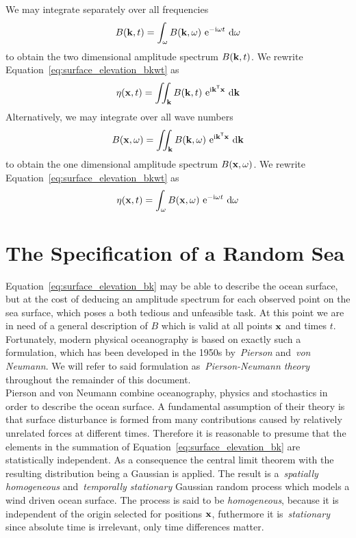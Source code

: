 We may integrate separately over all frequencies
%
\begin{equation}
 B(\mathbf{k}, t) = \int_{\omega} B(\mathbf{k},
\omega)~\mathrm{e}^{-\mathrm{i}\omega t}~\mathrm{d}\omega
\end{equation}
to obtain the two dimensional amplitude spectrum $B(\mathbf{k}, t)$. We rewrite
Equation~\ref{eq:surface_elevation_bkwt} as
\begin{equation}
\label{eq:surface_elevation_bk}
 \eta(\mathbf{x}, t) = \iint_{\mathbf{k}} B(\mathbf{k},t)
~\mathrm{e}^{\mathrm{i}\mathbf{k}^{\mathsf{T}}\mathbf{x}}~
\mathrm{d}\mathbf{k}
\end{equation}
%
Alternatively, we may integrate over all wave numbers
\begin{equation}
 B(\mathbf{x}, \omega) = \iint_{\mathbf{k}} B(\mathbf{k},
\omega)~\mathrm{e}^{\mathrm{i}\mathbf{k}^{\mathsf{T}}\mathbf{x}}~\mathrm{d}\mathbf{k}
\end{equation}
%
to obtain the one dimensional amplitude spectrum $B(\mathbf{x}, \omega)$. We
rewrite Equation~\ref{eq:surface_elevation_bkwt} as
\begin{equation}
\label{eq:surface_elevation_bw}
\eta(\mathbf{x}, t) = \int_{\omega} B(\mathbf{x},\omega)
~\mathrm{e}^{-\mathrm{i}\omega t}~\mathrm{d}\omega
\end{equation}
%
\section{The Specification of a Random Sea}
\label{sec:random_sea}
%
Equation~\ref{eq:surface_elevation_bk} may be able to describe the ocean
surface, but at the cost of deducing an amplitude spectrum for each observed
point on the sea surface, which poses a both tedious and unfeasible task. At
this point we are in need of a general description of $B$ which is valid at all
points $\mathbf{x}$ and times $t$. Fortunately, modern physical oceanography is
based on exactly such a formulation, which has been developed in the 1950s
by~\emph{Pierson} and~\emph{von Neumann}.  We will refer to
said formulation as~\emph{Pierson-Neumann theory} throughout the remainder of
this document.\\

Pierson and von Neumann combine oceanography, physics and stochastics in order
to describe the ocean surface. A fundamental assumption of their theory is that
surface disturbance is formed from many contributions caused by relatively
unrelated forces at different times. Therefore it is reasonable to presume that
the elements in the summation of Equation~\ref{eq:surface_elevation_bk} are
statistically independent. As a consequence the central limit theorem with the
resulting distribution being a Gaussian is applied. The result is
a~\emph{spatially homogeneous} and~\emph{temporally stationary} Gaussian random
process which models a wind driven ocean surface. The process is said to be
\emph{homogeneous}, because it is independent of the origin selected for
positions $\mathbf{x}$, futhermore it is~\emph{stationary} since absolute time is
irrelevant, only time differences matter.
%
